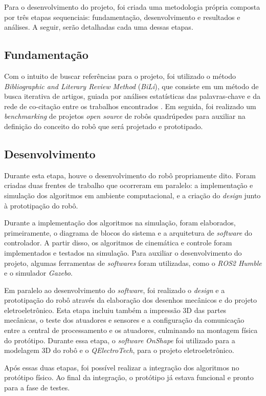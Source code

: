 \documentclass[../main.tex]{subfiles}
\begin{document}
  Para o desenvolvimento do projeto, foi criada uma metodologia própria composta por três etapas sequenciais: fundamentação, desenvolvimento e resultados e análises. A seguir, serão detalhadas cada uma dessas etapas.

  \subsection{Fundamentação}
  Com o intuito de buscar referências para o projeto, foi utilizado o método \textit{Bibliographic and Literary Review Method} (\textit{BiLi}), que consiste em um método de busca iterativa de artigos, guiada por análises estatísticas das palavras-chave e da rede de co-citação entre os trabalhos encontrados \cite{bili}. Em seguida, foi realizado um \textit{benchmarking} de projetos \textit{open source} de robôs quadrúpedes para auxiliar na definição do conceito do robô que será projetado e prototipado.
  
  \subsection{Desenvolvimento}
  Durante esta etapa, houve o desenvolvimento do robô propriamente dito. Foram criadas duas frentes de trabalho que ocorreram em paralelo: a implementação e simulação dos algoritmos em ambiente computacional, e a criação do \textit{design} junto à prototipação do robô.

  Durante a implementação dos algoritmos na simulação, foram elaborados, primeiramente, o diagrama de blocos do sistema e a arquitetura de \textit{software} do controlador. A partir disso, os algoritmos de cinemática e controle foram implementados e testados na simulação. Para auxiliar o desenvolvimento do projeto, algumas ferramentas de \textit{softwares} foram utilizadas, como o \textit{ROS2 Humble} e o simulador \textit{Gazebo}.

  Em paralelo ao desenvolvimento do \textit{software}, foi realizado o \textit{design} e a prototipação do robô através da elaboração dos desenhos mecânicos e do projeto eletroeletrônico. Esta etapa incluiu também a impressão 3D das partes mecânicas, o teste dos atuadores e sensores e a configuração da comunicação entre a central de processamento e os atuadores, culminando na montagem física do protótipo. Durante essa etapa, o \textit{software} \textit{OnShape} foi utilizado para a modelagem 3D do robô e o \textit{QElectroTech}, para o projeto eletroeletrônico.

  Após essas duas etapas, foi possível realizar a integração dos algoritmos no protótipo físico. Ao final da integração, o protótipo já estava funcional e pronto para a fase de testes.
\end{document}
